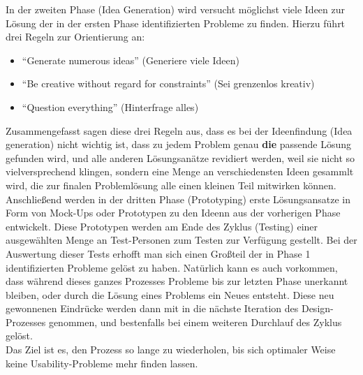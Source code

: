 In der zweiten Phase (Idea Generation) wird versucht möglichst viele Ideen zur Lösung der in der ersten Phase identifizierten Probleme zu finden.
Hierzu führt \citeauthor{Norman13} drei Regeln zur Orientierung an:

\begin{itemize}
  \item ``Generate numerous ideas'' (Generiere viele Ideen)
  \item ``Be creative without regard for constraints'' (Sei grenzenlos kreativ)
  \item ``Question everything'' (Hinterfrage alles)
\end{itemize}

\noindent
Zusammengefasst sagen diese drei Regeln aus, dass es bei der Ideenfindung (Idea generation) nicht wichtig ist, dass zu jedem Problem genau \textbf{die} passende Lösung gefunden wird, und alle anderen Lösungsanätze revidiert werden, weil sie nicht so vielversprechend klingen, sondern eine Menge an verschiedensten Ideen gesammlt wird, die zur finalen Problemlösung alle einen kleinen Teil mitwirken können. \\

Anschließend werden in der dritten Phase (Prototyping) erste Lösungsansatze in Form von Mock-Ups oder Prototypen zu den Ideenn aus der vorherigen Phase entwickelt.
Diese Prototypen werden am Ende des Zyklus (Testing) einer ausgewählten Menge an Test-Personen zum Testen zur Verfügung gestellt. Bei der Auswertung dieser Tests erhofft man sich einen Großteil der in Phase 1 identifizierten Probleme gelöst zu haben.
Natürlich kann es auch vorkommen, dass während dieses ganzes Prozesses Probleme bis zur letzten Phase unerkannt bleiben, oder durch die Lösung eines Problems ein Neues entsteht.
Diese neu gewonnenen Eindrücke werden dann mit in die nächste Iteration des Design-Prozesses genommen, und bestenfalls bei einem weiteren Durchlauf des Zyklus gelöst. \\

Das Ziel ist es, den Prozess so lange zu wiederholen, bis sich optimaler Weise keine Usability-Probleme mehr finden lassen. \\

